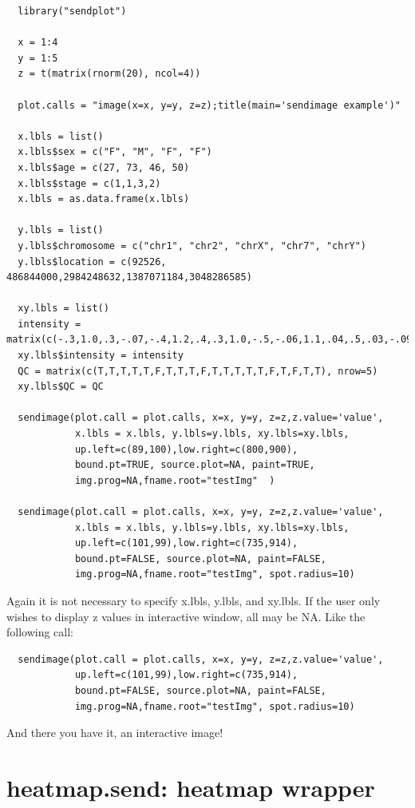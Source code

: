 \documentclass[]{article}
\begin{document}
\begin{verbatim}
  library("sendplot")

  x = 1:4
  y = 1:5
  z = t(matrix(rnorm(20), ncol=4))

  plot.calls = "image(x=x, y=y, z=z);title(main='sendimage example')"

  x.lbls = list()
  x.lbls$sex = c("F", "M", "F", "F")
  x.lbls$age = c(27, 73, 46, 50)
  x.lbls$stage = c(1,1,3,2)
  x.lbls = as.data.frame(x.lbls)
  
  y.lbls = list()
  y.lbls$chromosome = c("chr1", "chr2", "chrX", "chr7", "chrY")
  y.lbls$location = c(92526, 486844000,2984248632,1387071184,3048286585)
  
  xy.lbls = list()
  intensity = matrix(c(-.3,1.0,.3,-.07,-.4,1.2,.4,.3,1.0,-.5,-.06,1.1,.04,.5,.03,-.09,-.04,.06,.01,.03),nrow=5)
  xy.lbls$intensity = intensity
  QC = matrix(c(T,T,T,T,T,F,T,T,T,F,T,T,T,T,T,F,T,F,T,T), nrow=5)
  xy.lbls$QC = QC

  sendimage(plot.call = plot.calls, x=x, y=y, z=z,z.value='value',
            x.lbls = x.lbls, y.lbls=y.lbls, xy.lbls=xy.lbls,
            up.left=c(89,100),low.right=c(800,900),
            bound.pt=TRUE, source.plot=NA, paint=TRUE,
            img.prog=NA,fname.root="testImg"  )

  sendimage(plot.call = plot.calls, x=x, y=y, z=z,z.value='value',
            x.lbls = x.lbls, y.lbls=y.lbls, xy.lbls=xy.lbls,
            up.left=c(101,99),low.right=c(735,914),
            bound.pt=FALSE, source.plot=NA, paint=FALSE,
            img.prog=NA,fname.root="testImg", spot.radius=10)

\end{verbatim}


Again it is not necessary to specify x.lbls, y.lbls, and xy.lbls. If the user only wishes to display z values in interactive window, all may be NA. Like the following call:

\begin{verbatim}
  sendimage(plot.call = plot.calls, x=x, y=y, z=z,z.value='value',
            up.left=c(101,99),low.right=c(735,914),
            bound.pt=FALSE, source.plot=NA, paint=FALSE,
            img.prog=NA,fname.root="testImg", spot.radius=10)

\end{verbatim}

And there you have it, an interactive image! 

\newpage

\section{heatmap.send: heatmap wrapper}
\end{document}
